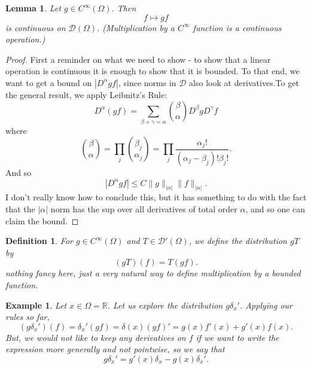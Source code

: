 \documentclass[letterpaper,twoside,11pt]{article}
\theoremstyle{mystyle}
\newtheorem{definition}{Definition}[section]
\newtheorem{lemma}[theorem]{Lemma}
\newtheorem*{ex}{Example}
\newcommand{\R}{{\mathbb R}}
\newcommand{\DD}{\mathcal D}
\newcommand{\cg}{\color{gray}}
\newcommand{\cbk}{\color{black}}
\begin{document}
\begin{lemma}
  Let $g \in C^\infty (\Omega)$. Then 
  \[f \mapsto gf\] is continuous on $\DD(\Omega)$. \cg (Multiplication by a $C^\infty$ function is a continuous operation.)\cbk 
\end{lemma}
\begin{proof}
  \cg First a reminder on what we need to show - to show that a linear operation is continuous it is enough to show that it is bounded. To that end, we want to get a bound on $|D^\alpha gf|$, since norms in $\DD$ also look at derivatives.\cbk To get the general result, we apply Leibnitz's Rule: 
  \[D^\alpha(gf) = \sum_{\beta + \gamma = \alpha} \binom{\beta}{\alpha} D^\beta g D^\gamma f \] where 
  \[\binom{\beta}{\alpha} = \prod_j \binom{\beta_j}{\alpha_j}  = \prod_j \frac{\alpha_j!}{(\alpha_j - \beta_j)! \beta_j!}.\]
  And so 
  \[|D^\alpha gf |\leq C\|g\|_{|\alpha|}\|f\|_{|\alpha|}. \]
  \cg I don't really know how to conclude this, but it has something to do with the fact that the $|\alpha|$ norm has the sup over all derivatives of total order $\alpha$, and so one can claim the bound. \cbk 
\end{proof}
\begin{definition}
  For $g \in C^\infty (\Omega)$ and $T \in \DD' (\Omega)$, we define the distribution $gT$ by 
  \[(gT) (f) = T(gf).\]\cg nothing fancy here, just a very natural way to define multiplication by a bounded function. \cbk
\end{definition}
\begin{ex}
  Let $x \in \Omega = \R$. Let us explore the distribution $g\delta_x'$. Applying our rules so far, 
  \[(g\delta_x')(f) = \delta_x'(gf) = \delta(x) (gf)' = g(x) f'(x) + g'(x) f(x).\]
  But, we would not like to keep any derivatives on $f$ if we want to write the expression more generally and not pointwise, so we say that 
  \[g\delta_x' =g'(x) \delta_x -g(x) \delta_x'.\]
\end{ex}
\end{document}
